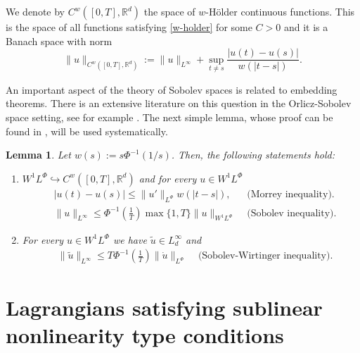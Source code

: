 \documentclass[twoside]{article}
\newtheorem{lem}[thm]{Lemma}
\theoremstyle{remark}
\newcommand{\orlnor}{\|_{L^{\Phi}}}
\newcommand{\lphi}{L^{\Phi}}
\newcommand{\wphi}{W^{1}\lphi}
\newcommand{\sobnor}{\|_{W^{1}\lphi}}
\newcommand{\rr}{\mathbb{R}}
\renewcommand{\leq}{\leqslant}
\begin{document}
We denote by $C^w([0,T],\rr^d)$  the space of  $w$-H\"older continuous functions. This is the space of all functions satisfying \eqref{w-holder} for some $C>0$ and it is a Banach space with norm
\[\|u\|_{  C^w([0,T],\rr^d) }  :=\|u\|_{L^{\infty}}+\sup\limits_{t\neq s}\frac{|u(t)-u(s)|}{w(|t-s|)}.\]





 An important aspect of the theory of Sobolev spaces is related to embedding theorems. There is an extensive literature on this question in the  Orlicz-Sobolev space setting, see for example
 \cite{cianchi2000fully,cianchi1999some,claverooptimal,edmunds2000optimal,kerman2006optimal}.
The next simple lemma, whose proof can be found in \cite{ABGMS2015}, will be used systematically.




\begin{lem}\label{inclusion orlicz} Let  $w(s):= s\Phi^{-1}(1/s)$. Then, the following statements hold:
\begin{enumerate}
\item\label{inclusion orlicz_item1} $\wphi\hookrightarrow C^w([0,T],\rr^d) $ and for every $u\in\wphi$
\begin{align}
 &\left|u(t)-u(s) \right| \leq  \|u'\orlnor w(| t-s|),&\text{  (Morrey inequality).}\label{in-sob-cont}
\\
& \|u\|_{L^{\infty}} \leq\Phi^{-1}\left(\frac{1}{T}\right)\max\{1,T\}\|u\sobnor&\text{  (Sobolev inequality).}\label{sobolev}
\end{align}
\item For every $u\in\wphi$ we have $\widetilde{u}\in L^{\infty}_d$ and
\begin{align}
& \|\widetilde{u}\|_{L^{\infty}} \leq T\Phi^{-1}\left(\frac{1}{T}\right)\|\dot{u}\orlnor&\text{  (Sobolev-Wirtinger inequality).}\label{wirtinger}
\end{align}




\end{enumerate}
\end{lem}






\section{Lagrangians satisfying  sublinear nonlinearity type conditions}
\end{document}
